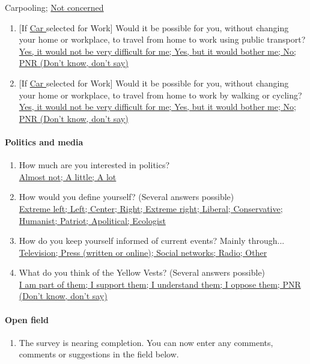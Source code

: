 \documentclass[english,5p,authoryear]{elsarticle}
\begin{document}
\begin{appendices}
{Carpooling;} \uline{Not concerned} 
\begin{enumerate}[resume,leftmargin=*]
\item {[}If \uline{Car }selected for Work{]} Would it be possible for you,
without changing your home or workplace, to travel from home to work
using public transport? \uline{}\\
\uline{Yes, it would not be very difficult for me; Yes, but it would
bother me; No; PNR (Don't know, don't say) }
\item {[}If \uline{Car }selected for Work{]} Would it be possible for you,
without changing your home or workplace, to travel from home to work
by walking or cycling? \uline{}\\
\uline{Yes, it would not be very difficult for me; Yes, but it would
bother me; No; PNR (Don't know, don't say) }
\end{enumerate}

\paragraph{Politics and media}
\begin{enumerate}[resume,leftmargin=*]
\item How much are you interested in politics? \uline{}\\
\uline{Almost not; A little; A lot }
\item How would you define yourself? (Several answers possible) \uline{}\\
\uline{Extreme left; Left; Center; Right; Extreme right; Liberal; Conservative;
Humanist; Patriot; Apolitical; Ecologist }
\item How do you keep yourself informed of current events? Mainly through...
\uline{}\\
\uline{Television; Press (written or online); Social networks; Radio;
Other}
\item What do you think of the Yellow Vests? (Several answers possible)
\uline{}\\
\uline{I am part of them; I support them; I understand them; I oppose
them; PNR (Don't know, don't say) }
\end{enumerate}

\paragraph{Open field}
\begin{enumerate}[resume,leftmargin=*]
\item The survey is nearing completion. You can now enter any comments,
comments or suggestions in the field below.
\end{enumerate}


\end{appendices}
\end{document}
